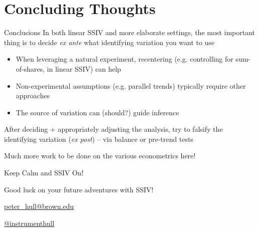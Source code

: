\documentclass{beamer}
\begin{document}
\section{Concluding Thoughts}
\begin{frame}{Conclusions}
In both linear SSIV and more elaborate settings, the most important thing is to decide \emph{ex ante} what identifying variation you want to use\smallskip\pause
\begin{itemize}
\item When leveraging a natural experiment, recentering (e.g. controlling for sum-of-shares, in linear SSIV) can help\smallskip\pause
\item Non-experimental assumptions (e.g. parallel trends) typically require other approaches\pause{} \smallskip
\item The source of variation can (should?) guide inference 
\end{itemize}\medskip\pause

After deciding + appropriately adjusting the analysis, try to falsify the identifying variation (\emph{ex post}) -- via balance or pre-trend tests\bigskip\pause

Much more work to be done on the various econometrics here!
\end{frame}


\begin{frame}{Keep Calm and SSIV On!}

\begin{center}
Good luck on your future adventures with SSIV!

\bigskip
\url{peter_hull@brown.edu}

\bigskip
\url{@instrumenthull}
\end{center}
\end{frame}
\end{document}
